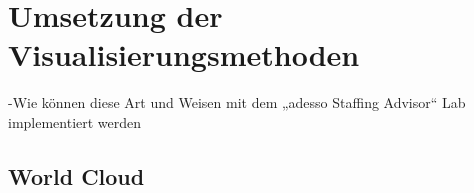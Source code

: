 \chapter{Umsetzung der Visualisierungsmethoden}
\label{chap:implementation}
-Wie können diese Art und Weisen mit dem „adesso Staffing Advisor“ Lab implementiert werden

\section{World Cloud}

\newpage